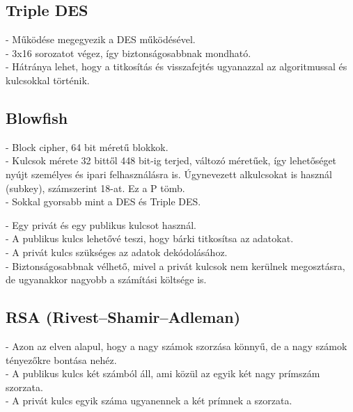 \subsection{Triple DES}
\noindent- Működése megegyezik a DES működésével.
\vspace{5pt}\\- 3x16 sorozatot végez, így biztonságosabbnak mondható.
\vspace{5pt}\\- Hátránya lehet, hogy a titkosítás és visszafejtés ugyanazzal az algoritmussal és kulcsokkal történik.



\subsection{Blowfish}
\noindent - Block cipher, 64 bit méretű blokkok.
\vspace{5pt}\\- Kulcsok mérete 32 bittől 448 bit-ig terjed, változó méretűek, így lehetőséget nyújt személyes és ipari felhasználásra is. Úgynevezett alkulcsokat is használ (subkey), számszerint 18-at. Ez a P tömb.
\vspace{5pt}\\- Sokkal gyorsabb mint a DES és Triple DES.









\noindent - Egy privát és egy publikus kulcsot használ.
\vspace{5pt} \\- A publikus kulcs lehetővé teszi, hogy bárki titkosítsa az adatokat.
\vspace{5pt} \\- A privát kulcs szükséges az adatok  dekódolásához. 
\vspace{5pt} \\- Biztonságosabbnak vélhető, mivel a privát kulcsok nem kerülnek megosztásra, de ugyanakkor nagyobb a számítási költsége is.\newline

\subsection{RSA (Rivest–Shamir–Adleman)}
\noindent - Azon az elven alapul, hogy a nagy számok szorzása könnyű, de a nagy számok tényezőkre bontása nehéz. 
\vspace{5pt}\\- A publikus kulcs két számból áll, ami közül az egyik két nagy prímszám szorzata.
\vspace{5pt}\\- A privát kulcs egyik száma ugyanennek a két prímnek a szorzata.


